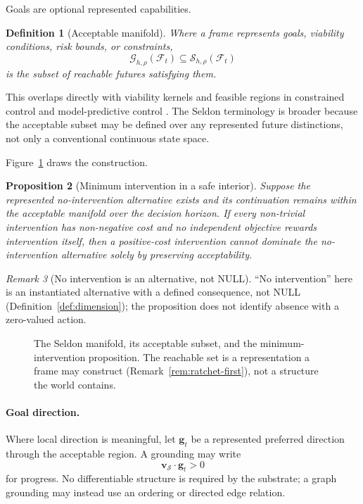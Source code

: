 \documentclass[11pt,a4paper]{article}
\newtheorem{definition}{Definition}[section]
\newtheorem{proposition}[definition]{Proposition}
\theoremstyle{remark}
\newtheorem{remark}[definition]{Remark}
\newcommand{\Frame}{\mathcal F}
\newcommand{\Seldon}{\mathcal S}
\newcommand{\Goal}{\mathcal G}
\begin{document}
Goals are optional represented capabilities.

\begin{definition}[Acceptable manifold]\label{def:acceptable}
Where a frame represents goals, viability conditions, risk bounds, or constraints,
\[
\boxed{\Goal_{h,\rho}(\Frame_t)\subseteq\Seldon_{h,\rho}(\Frame_t)}
\]
is the subset of reachable futures satisfying them.
\end{definition}

This overlaps directly with viability kernels and feasible regions in constrained control and model-predictive control \citep{aubin1991,rawlings2017,cunis2021}. The Seldon terminology is broader because the acceptable subset may be defined over any represented future distinctions, not only a conventional continuous state space.

Figure~\ref{fig:tube} draws the construction.

\begin{proposition}[Minimum intervention in a safe interior]\label{prop:min-intervention}
Suppose the represented no-intervention alternative exists and its continuation remains within the acceptable manifold over the decision horizon. If every non-trivial intervention has non-negative cost and no independent objective rewards intervention itself, then a positive-cost intervention cannot dominate the no-intervention alternative solely by preserving acceptability.
\end{proposition}

\begin{remark}[No intervention is an alternative, not NULL]\label{rem:no-intervention-not-null}
``No intervention'' here is an instantiated alternative with a defined consequence, not NULL (Definition~\ref{def:dimension}); the proposition does not identify absence with a zero-valued action.
\end{remark}

\begin{figure}[t]
\centering
\resizebox{\textwidth}{!}{}
\caption{The Seldon manifold, its acceptable subset, and the minimum-intervention
proposition. The reachable set is a representation a frame may construct
(Remark~\ref{rem:ratchet-first}), not a structure the world contains.}
\label{fig:tube}
\end{figure}

\paragraph{Goal direction.}
Where local direction is meaningful, let $\mathbf g_t$ be a represented preferred direction through the acceptable region. A grounding may write
\[
\mathbf v_{\Seldon}\cdot\mathbf g_t>0
\]
for progress. No differentiable structure is required by the substrate; a graph grounding may instead use an ordering or directed edge relation.
\end{document}
